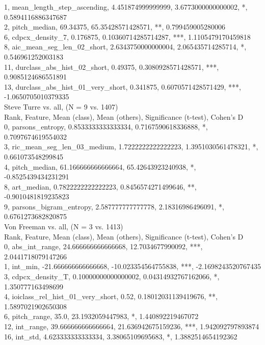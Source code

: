 1, mean_length_step_ascending, 4.451874999999999, 3.6773000000000002, *, 0.5894116886347687\\
2, pitch_median, 69.34375, 65.35428571428571, **, 0.799459005280006\\
6, cdpcx_density_7, 0.176875, 0.10360714285714287, ***, 1.1105479170459818\\
8, aic_mean_seg_len_02_short, 2.6343750000000004, 2.065435714285714, *, 0.546961252003183\\
11, durclass_abs_hist_02_short, 0.49375, 0.3080928571428571, ***, 0.9085124686551891\\
13, durclass_abs_hist_01_very_short, 0.341875, 0.6070571428571429, ***, -1.0650705010379335\\
Steve Turre vs. all, (N = 9 vs. 1407)\\
Rank, Feature, Mean (class), Mean (others), Significance (t-test), Cohen's D\\
0, parsons_entropy, 0.8533333333333334, 0.7167590618336888, *, 0.7097674619554032\\
3, ric_mean_seg_len_03_medium, 1.7222222222222223, 1.3951030561478321, *, 0.661073548299845\\
4, pitch_median, 61.166666666666664, 65.42643923240938, *, -0.8525439434231291\\
8, art_median, 0.7822222222222223, 0.8456574271499646, **, -0.9010481819235823\\
9, parsons_bigram_entropy, 2.587777777777778, 2.18316986496091, *, 0.6761273682820875\\
Von Freeman vs. all, (N = 3 vs. 1413)\\
Rank, Feature, Mean (class), Mean (others), Significance (t-test), Cohen's D\\
0, abs_int_range, 24.666666666666668, 12.7034677990092, ***, 2.0441718079147266\\
1, int_min, -21.666666666666668, -10.023354564755838, ***, -2.1698243520767435\\
3, cdpcx_density_T, 0.10000000000000002, 0.04314932767162066, *, 1.350777163498699\\
4, ioiclass_rel_hist_01_very_short, 0.52, 0.18012031139419676, **, 1.5897021902650308\\
6, pitch_range, 35.0, 23.1932059447983, *, 1.440892219467072\\
12, int_range, 39.666666666666664, 21.636942675159236, ***, 1.942092797893874\\
16, int_std, 4.623333333333334, 3.38065109695683, *, 1.3882514654192362\\
